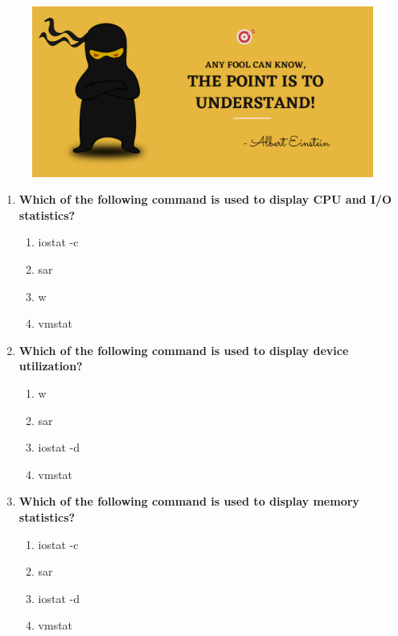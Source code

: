 \setlength{\columnsep}{3pt}
\begin{flushleft}
	
	\paragraph{}
	\bigskip
	
	\begin{figure}[h!]
		\centering
		\includegraphics[scale=.2]{content/practise.jpg}
	\end{figure}	
	\begin{enumerate}
		
		\item \textbf{Which of the following command is used to display CPU and I/O statistics?}
		\begin{enumerate}[label=(\alph*)]
			\item iostat -c   %
			\item sar  %
			\item w
			\item vmstat
		\end{enumerate}
		\bigskip
		\bigskip	
		
		\item \textbf{Which of the following command is used to display device utilization?}
		\begin{enumerate}[label=(\alph*)]
			\item w
			\item sar
			\item iostat -d %
			\item vmstat
		\end{enumerate}
		\bigskip
		\bigskip	

		\item \textbf{Which of the following command is used to display memory statistics?}
		\begin{enumerate}[label=(\alph*)]
			\item iostat -c
			\item sar
			\item iostat -d 
			\item vmstat %
		\end{enumerate}
		\bigskip
		\bigskip	
		

\end{enumerate}
\end{flushleft}

